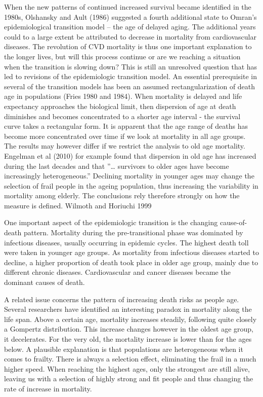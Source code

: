 \documentclass[a4paper,12pt]{article}
\begin{document}
When the new patterns of continued increased survival became identified in
the 1980s, Olshansky and Ault (1986) suggested a fourth additional state to
Omran’s epidemiological transition model – the age of delayed aging. The
additional years could to a large extent be attributed to decrease in
mortality from cardiovascular diseases. The revolution of CVD mortality is
thus one important explanation to the longer lives, but will this process
continue or are we reaching a situation when the transition is slowing
down? This is still an unresolved question that has led to revisions of the
epidemiologic transition model. An essential prerequisite in several of the
transition models has been an assumed rectangularization of death age in
populations (Fries 1980 and 1984). When mortality is delayed and life
expectancy approaches the biological limit, then dispersion of age at death
diminishes and becomes concentrated to a shorter age interval - the
survival curve takes a rectangular form. It is apparent that the age range
of deaths has become more concentrated over time if we look at mortality in
all age groups. The results may however differ if we restrict the analysis
to old age mortality. Engelman et al (2010) for example found that
dispersion in old age has increased during the last decades and that ”…
survivors to older ages have become increasingly heterogeneous.” Declining
mortality in younger ages may change the selection of frail people in the
ageing population, thus increasing the variability in mortality among
elderly. The conclusions rely therefore strongly on how the measure is
defined. Wilmoth and Horiuchi 1999  

One important aspect of the epidemiologic transition is the changing
cause-of-death pattern. Mortality during the pre-transitional phase was
dominated by infectious diseases, usually occurring in epidemic cycles. The
highest death toll were taken in younger age groups. As mortality from
infectious diseases started to decline, a higher proportion of death took
place in older age group, mainly due to different chronic
diseases. Cardiovascular and cancer diseases became the dominant causes of
death. 

A related issue concerns the pattern of increasing death risks as people
age. Several researchers have identified an interesting paradox in
mortality along the life span. Above a certain age, mortality increases
steadily, following quite closely a Gompertz distribution. This increase
changes however in the oldest age group, it decelerates. For the very old,
the mortality increase is lower than for the ages below. A plausible
explanation is that populations 
are heterogeneous when it comes to frailty. There is always a selection
effect, eliminating the frail in a much higher speed. When reaching the
highest ages, only the strongest are still alive, leaving us with a
selection of highly strong and fit people and thus changing the rate of
increase in mortality. 
\end{document}
